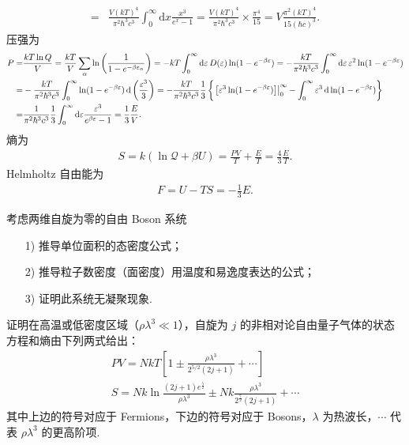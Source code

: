 \documentclass{assignment}
\begin{document}
\begin{pf}
\begin{align}
        =&\frac{V(kT)^4}{\pi^2\hbar^3c^3}\int_0^{\infty}\mathrm{d}x\frac{x^3}{e^x-1}=\frac{V(kT)^4}{\pi^2\hbar^3c^3}\times\frac{\pi^4}{15}=V\frac{\pi^2(kT)^4}{15(\hbar c)^3}.
    \end{align}
    压强为
    \begin{align}
        \notag P=&\frac{kT\ln Q}{V}=\frac{kT}{V}\sum_{\alpha}\ln\left(\frac{1}{1-e^{-\beta\varepsilon_{\alpha}}}\right)=-kT\int_0^{\infty}\mathrm{d}\varepsilon\,D(\varepsilon)\ln(1-e^{-\beta\varepsilon})=-\frac{kT}{\pi^2\hbar^3c^3}\int_0^{\infty}\mathrm{d}\varepsilon\,\varepsilon^2\ln(1-e^{-\beta\varepsilon})\\
        \notag=&-\frac{kT}{\pi^2\hbar^3c^3}\int_0^{\infty}\ln(1-e^{-\beta\varepsilon})\,\mathrm{d}\left(\frac{\varepsilon^3}{3}\right)=-\frac{kT}{\pi^2\hbar^3c^3}\frac{1}{3}\left\{\left.\left[\varepsilon^3\ln(1-e^{-\beta\varepsilon})\right]\right\rvert_0^{\infty}-\int_0^{\infty}\varepsilon^3\,\mathrm{d}\ln(1-e^{-\beta\varepsilon})\right\}\\
        \notag=&\frac{1}{\pi^2\hbar^3c^3}\frac{1}{3}\int_0^{\infty}\mathrm{d}\varepsilon\frac{\varepsilon^3}{e^{\beta\varepsilon}-1}=\frac{1}{3}\frac{E}{V}.
    \end{align}
    熵为
    \begin{align}
        S=k(\ln\mathcal{Q}+\beta U)=\frac{PV}{T}+\frac{E}{T}=\frac{4}{3}\frac{E}{T}.
    \end{align}
    Helmholtz 自由能为
    \begin{align}
        F=U-TS=-\frac{1}{3}E.
    \end{align}
\end{pf}

\begin{prob}
    考虑两维自旋为零的自由 Boson 系统
    \begin{itemize}
        \item[1)] 推导单位面积的态密度公式；
        \item[2)] 推导粒子数密度（面密度）用温度和易逸度表达的公式；
        \item[3)] 证明此系统无凝聚现象.
    \end{itemize}
\end{prob}
\begin{sol}
    
\end{sol}

\begin{prob}
    证明在高温或低密度区域（$\rho\lambda^3\ll 1$），自旋为 $j$ 的非相对论自由量子气体的状态方程和熵由下列两式给出：
    \begin{gather*}
        PV=NkT\left[1\pm\frac{\rho\lambda^3}{2^{5/2}(2j+1)}+\cdots\right]\\
        S=Nk\ln\frac{(2j+1)e^{\frac{5}{2}}}{\rho\lambda^3}\pm Nk\frac{\rho\lambda^3}{2^{\frac{7}{2}}(2j+1)}+\cdots
    \end{gather*}
    其中上边的符号对应于 Fermions，下边的符号对应于 Bosons，$\lambda$ 为热波长，$\cdots$ 代表 $\rho\lambda^3$ 的更高阶项.
\end{prob}
\begin{pf}
    
\end{pf}
\end{document}
